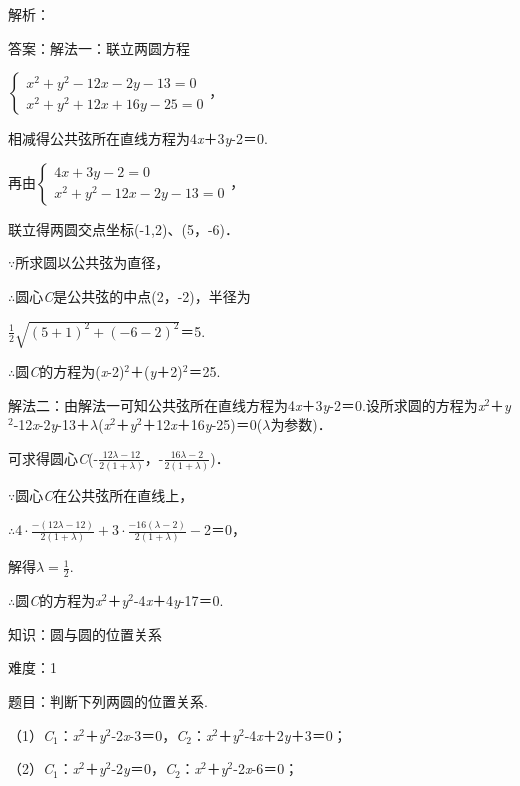 \documentclass{article} %
\begin{document}
解析：

答案：解法一：联立两圆方程

$\left\{\begin{array}{r} x^2+y^2-12x-2y-13=0\\ x^2+y^2+12x+16y-25=0 \end{array} \right.$，

相减得公共弦所在直线方程为4\textit{x}＋3\textit{y}-2＝0.

再由$\left\{\begin{array}{r} 4x+3y-2=0\\ x^2+y^2-12x-2y-13=0 \end{array} \right.$，

联立得两圆交点坐标(-1,2)、(5，-6)．

$\mathrm{\because}$所求圆以公共弦为直径，

$\mathrm{\therefore}$圆心\textit{C}是公共弦的中点(2，-2)，半径为

$\frac{1}{2}\sqrt{(5+1)^2+(-6-2)^2}$＝5.

$\mathrm{\therefore}$圆\textit{C}的方程为(\textit{x}-2)${}^{2}$＋(\textit{y}＋2)${}^{2}$＝25.

解法二：由解法一可知公共弦所在直线方程为4\textit{x}＋3\textit{y}-2＝0.设所求圆的方程为\textit{x}${}^{2}$＋\textit{y}${}^{2}$-12\textit{x}-2\textit{y}-13＋\textit{$\lambda$}(\textit{x}${}^{2}$＋\textit{y}${}^{2}$＋12\textit{x}＋16\textit{y}-25)＝0(\textit{$\lambda$}为参数)．

可求得圆心\textit{C}(-$\frac{12\lambda-12}{2(1+\lambda)}$，-$\frac{16\lambda-2}{2(1+\lambda)}$)．

$\mathrm{\because}$圆心\textit{C}在公共弦所在直线上，

$\mathrm{\therefore}4\cdot\frac{-(12\lambda-12)}{2(1+\lambda)}+3\cdot\frac{-16(\lambda-2)}{2(1+\lambda)}-$2＝0，

解得$\lambda=\frac{1}{2}$.

$\mathrm{\therefore}$圆\textit{C}的方程为\textit{x}${}^{2}$＋\textit{y}${}^{2}$-4\textit{x}＋4\textit{y}-17＝0.

知识：圆与圆的位置关系

难度：1

题目：判断下列两圆的位置关系.

（1）\textit{C}${}_{1}$：\textit{x}${}^{2}$＋\textit{y}${}^{2}$-2\textit{x}-3＝0，\textit{C}${}_{2}$：\textit{x}${}^{2}$＋\textit{y}${}^{2}$-4\textit{x}＋2\textit{y}＋3＝0；

（2）\textit{C}${}_{1}$：\textit{x}${}^{2}$＋\textit{y}${}^{2}$-2\textit{y}＝0，\textit{C}${}_{2}$：\textit{x}${}^{2}$＋\textit{y}${}^{2}$-2\textit{x}-6＝0；
\end{document}
